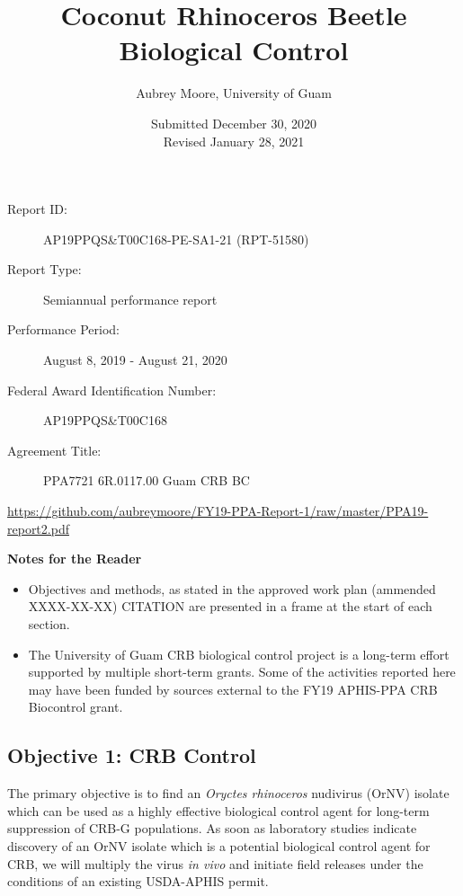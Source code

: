 \documentclass[12pt,letterpaper,english,bibliography=totocnumbered,abstract=on]{scrartcl}
\begin{document}
\titlehead{USDA-APHIS Progress Report}
\title{Coconut Rhinoceros Beetle Biological Control}
\author{Aubrey Moore, University of Guam}
\date{Submitted December 30, 2020\\Revised January 28, 2021}
\maketitle
\begin{description}	
	\item[Report ID:] AP19PPQS\&T00C168-PE-SA1-21 (RPT-51580)
	\item[Report Type:] Semiannual performance report
	\item[Performance Period:] August 8, 2019 - August 21, 2020
	\item[Federal Award Identification Number:] AP19PPQS\&T00C168
	\item[Agreement Title:] PPA7721 6R.0117.00 Guam CRB BC
\end{description}

\begin{footnotesize}
\url{https://github.com/aubreymoore/FY19-PPA-Report-1/raw/master/PPA19-report2.pdf}
\end{footnotesize}

\newpage{}
\tableofcontents{}

\clearpage
\textbf{Notes for the Reader}
\begin{itemize}
	
	\item Objectives and methods, as stated in the approved work plan (ammended XXXX-XX-XX) CITATION are presented in a frame at the start of each section. 
	
	\item The University of Guam CRB biological control project is a long-term effort supported by multiple short-term grants. Some of the activities reported here may have been funded by sources external to the FY19 APHIS-PPA CRB Biocontrol grant.  
	
\end{itemize}


\newpage

\listoftodos

\newpage

\begin{framed}
\section{Objective 1: CRB Control}

The primary objective is to find an \textit{Oryctes rhinoceros} nudivirus (OrNV) isolate which can be used as a highly effective biological control agent for long-term suppression of CRB-G populations. As soon as laboratory studies indicate discovery of an OrNV isolate which is a potential biological control agent for CRB, we will multiply the virus \textit{in vivo} and initiate field releases under the conditions of an existing USDA-APHIS permit.
\end{framed}
\end{document}
